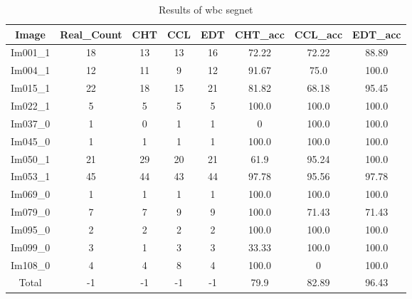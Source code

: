 \begin{table}[H]
    \centering
    \begin{tabular}{|c|c|c|c|c|c|c|c|}
    \hline
     \textbf{Image} & \textbf{Real\_Count} & \textbf{CHT} & \textbf{CCL} & \textbf{EDT} & \textbf{CHT\_acc} & \textbf{CCL\_acc} & \textbf{EDT\_acc} \\ \hline
     Im001\_1 & 18 & 13 & 13 & 16 & 72.22 & 72.22 & 88.89 \\ 
     Im004\_1 & 12 & 11 & 9 & 12 & 91.67 & 75.0 & 100.0 \\ 
     Im015\_1 & 22 & 18 & 15 & 21 & 81.82 & 68.18 & 95.45 \\ 
     Im022\_1 & 5 & 5 & 5 & 5 & 100.0 & 100.0 & 100.0 \\ 
     Im037\_0 & 1 & 0 & 1 & 1 & 0 & 100.0 & 100.0 \\ 
     Im045\_0 & 1 & 1 & 1 & 1 & 100.0 & 100.0 & 100.0 \\ 
     Im050\_1 & 21 & 29 & 20 & 21 & 61.9 & 95.24 & 100.0 \\ 
     Im053\_1 & 45 & 44 & 43 & 44 & 97.78 & 95.56 & 97.78 \\ 
     Im069\_0 & 1 & 1 & 1 & 1 & 100.0 & 100.0 & 100.0 \\ 
     Im079\_0 & 7 & 7 & 9 & 9 & 100.0 & 71.43 & 71.43 \\ 
     Im095\_0 & 2 & 2 & 2 & 2 & 100.0 & 100.0 & 100.0 \\ 
     Im099\_0 & 3 & 1 & 3 & 3 & 33.33 & 100.0 & 100.0 \\ 
     Im108\_0 & 4 & 4 & 8 & 4 & 100.0 & 0 & 100.0 \\ \hline
     Total & -1 & -1 & -1 & -1 & 79.9 & 82.89 & 96.43 \\ 
    
    \hline
    \end{tabular}
    \caption{Results of wbc segnet}
    \label{Results of wbc segnet}
    \end{table}
    
